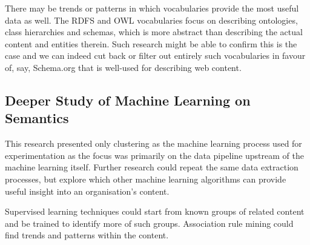 There may be trends or patterns in which vocabularies provide the
most useful data as well. The RDFS and OWL vocabularies focus on
describing ontologies, class hierarchies and schemas, which is more
abstract than describing the actual content and entities therein. Such
research might be able to confirm this is the case and we can indeed
cut back or filter out entirely such vocabularies in favour of, say,
Schema.org that is well-used for describing web content.

\subsection{Deeper Study of Machine Learning on Semantics}

This research presented only clustering as the machine learning
process used for experimentation as the focus was primarily on the
data pipeline upstream of the machine learning itself. Further
research could repeat the same data extraction processes, but explore
which other machine learning algorithms can provide useful insight
into an organisation's content.

Supervised learning techniques could start from known groups of
related content and be trained to identify more of such groups.
Association rule mining could find trends and patterns within
the content.
